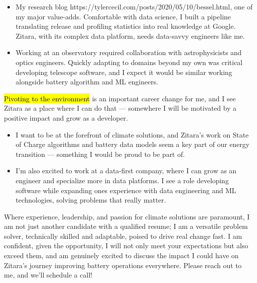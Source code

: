 \documentclass{tc_cv}
\begin{document}
\begin{adjustwidth}{38pt}{38pt}
\begin{itemize}
    \item My research blog \cite{dives into
      statistics}{https://tylercecil.com/posts/2020/05/10/bessel.html}, one of
      my major value-adds. Comfortable with data science, I built a pipeline
      translating release and profiling statistics into real knowledge at
      Google. Zitara, with its complex data platform, needs data-savvy
      engineers like me.

    \item Working at an observatory required collaboration with astrophysicists
      and optics engineers. Quickly adapting to domains beyond my own was
      critical developing telescope software, and I expect it would be similar
      working alongside battery algorithm and ML engineers.

  \end{itemize} \medskip

  \hl{Pivoting to the environment} is an important career change for me,
  and I see Zitara as a place where I can do that --- somewhere I will be
  motivated by a positive impact and grow as a developer.
  \begin{itemize}


    \item I want to be at the forefront of climate solutions, and Zitara's work
      on State of Charge algorithms and battery data models seem a key part of
      our energy transition --- something I would be proud to be part of.

    \item I'm also excited to work at a data-first company, where I can grow as
      an engineer and specialize more in data platforms. I see a role
      developing software while expanding ones experience with data engineering
      and ML technologies, solving problems that really matter.

  \end{itemize} \medskip

  Where experience, leadership, and passion for climate solutions are
  paramount, I am not just another candidate with a qualified resume; I am a
  versatile problem solver, technically skilled and adaptable, poised to drive
  real change fast. I am confident, given the opportunity,  I will not only
  meet your expectations but also exceed them, and am genuinely excited to
  discuss the impact I could have on Zitara's journey improving battery
  operations everywhere. Please reach out to me, and we'll schedule a call!
  \medskip


\end{adjustwidth}
\end{document}
